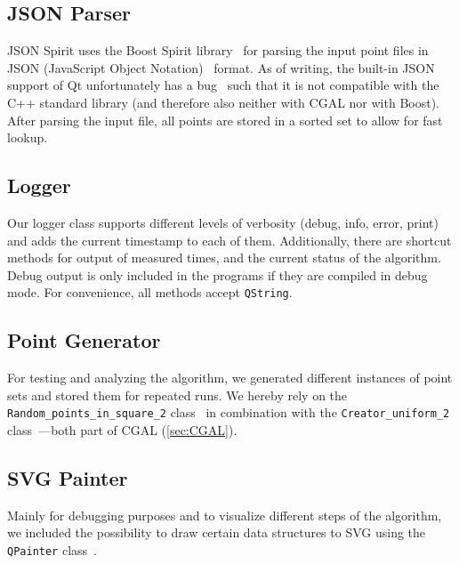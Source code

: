 \subsection{JSON Parser}
\label{sec:json_parser}
JSON Spirit \cite{json_spirit} uses the Boost Spirit
library~\cite{boost_spirit} for parsing the input point files in
JSON (JavaScript Object Notation)~\cite{json} format. As of writing,
the built-in JSON support of Qt unfortunately has a
bug~\cite{json_bug} such that it is not compatible with the C++
standard library (and therefore also neither with \gls{CGAL} nor with
Boost). After parsing the input file, all points are stored in a
sorted set to allow for fast lookup.

\subsection{Logger}
\label{sec:logger}
Our logger class supports different levels of verbosity
(debug, info, error, print) and adds the current timestamp to each
of them. Additionally, there are shortcut methods for output of
measured times, and the current status of the algorithm. Debug output
is only included in the programs if they are compiled in debug mode.
For convenience, all methods accept \verb|QString|.

\subsection{Point Generator}
For testing and analyzing the algorithm, we generated different
instances of point sets and stored them for repeated runs. We hereby
rely on the \verb|Random_points_in_square_2| 
class~\cite{cgal_manual_random_points} in combination with the
\verb|Creator_uniform_2| class~\cite{cgal_manual_creator_uniform}---both
part of \gls{CGAL} (\cref{sec:CGAL}).

\subsection{SVG Painter}
\label{sec:svg_painter}
Mainly for debugging purposes and to visualize different steps of the
algorithm, we included the possibility to draw certain data structures
to SVG using the \verb|QPainter| class~\cite{qt_manual_qpainter}.

